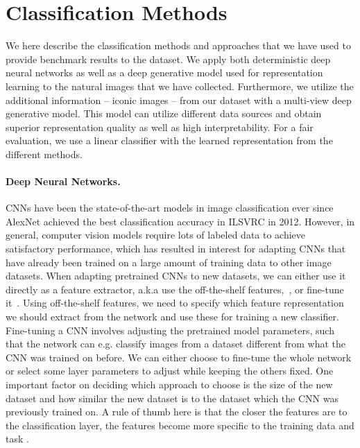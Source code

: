\section{Classification Methods}\label{sec:classification-methods}

We here describe the classification methods and approaches that we have used to provide benchmark results to the dataset. We apply both deterministic deep neural networks as well as a deep generative model used for representation learning to the natural images that we have collected. Furthermore, we utilize the additional information -- iconic images -- from our dataset with a multi-view deep generative model. This model can utilize different data sources and obtain superior representation quality as well as high interpretability. For a fair evaluation, we use a linear classifier with the learned representation from the different methods.

\paragraph*{Deep Neural Networks.} 
CNNs have been the state-of-the-art models in image classification ever since AlexNet \cite{krizhevsky2012imagenet} achieved the best classification accuracy in ILSVRC in 2012.
However, in general, computer vision models require lots of labeled data to achieve satisfactory performance, which has resulted in interest for adapting CNNs that have already been trained on a large amount of training data to other image datasets. When adapting pretrained CNNs to new datasets, we can either use it directly as a feature extractor, a.k.a use the off-the-shelf features,~\cite{donahue2014decaf,razavian2014cnnfeatures}, or fine-tune it~\cite{Girshick2014rich-feature-hierarchies,oquab2014learning-and-transferring,pan2010transferlearning,yosinski2014transferable,Zhang2014PartbasedRCNN}. Using off-the-shelf features, we need to specify which feature representation we should extract from the network and use these for training a new classifier. Fine-tuning a CNN involves adjusting the pretrained model parameters, such that the network can e.g. classify images from a dataset different from what the CNN was trained on before. We can either choose to fine-tune the whole network or select some layer parameters to adjust while keeping the others fixed. One important factor on deciding which approach to choose is the size of the new dataset and how similar the new dataset is to the dataset which the CNN was previously trained on. A rule of thumb here is that the closer the features are to the classification layer, the features become more specific to the training data and task \cite{yosinski2014transferable}. 

